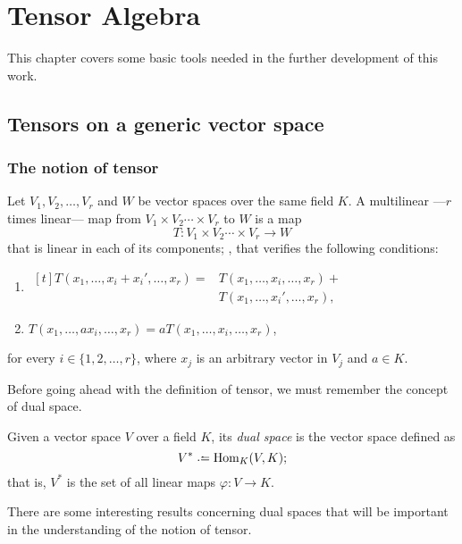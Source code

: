 \chapter{Tensor Algebra}

This chapter covers some basic tools needed in the further development of this work.

\section{Tensors on a generic vector space}

\subsection{The notion of tensor}

\begin{definition}
	\label{def:multilinear}
    Let $V_1, V_2, \dots, V_r$ and $W$ be vector spaces over the same field $K$. A multilinear ---$r$ times linear--- map from $V_1 \times V_2 \cdots \times V_r$ to $W$ is a map
    \[
        T \colon V_1 \times V_2 \cdots \times V_r \longrightarrow W
    \]
    that is linear in each of its components; \ie, that verifies the following conditions:
    \begin{enumerate}
        \item $\begin{aligned}[t]
	        T(x_1, \dots, x_i+x_i', \dots, x_r) = &T(x_1, \dots, x_i, \dots, x_r) + \\&T(x_1, \dots, x_i', \dots, x_r),
        \end{aligned}$
        \item $T(x_1, \dots, a x_i, \dots, x_r) = aT(x_1, \dots, x_i, \dots, x_r)$,
    \end{enumerate}
    for every $i \in \{1, 2, \dots, r\}$, where $x_j$ is an arbitrary vector in $V_j$ and $a \in K$.
\end{definition}

Before going ahead with the definition of tensor, we must remember the concept of dual space.

Given a vector space $V$ over a field $K$, its \emph{dual space} is the vector space defined as
\[
	V^* \defeq \Hom_K(V,K);
\]
that is, $V^*$ is the set of all linear maps $\varphi : V \to K$.

There are some interesting results concerning dual spaces that will be important in the understanding of the notion of tensor.

